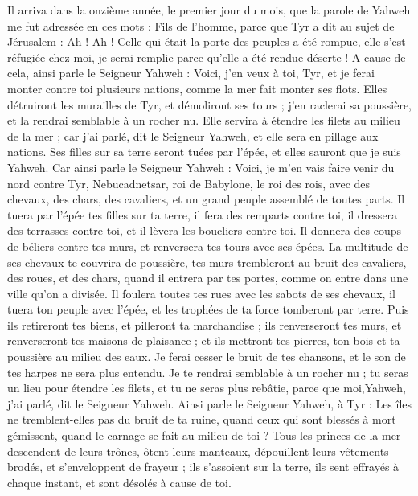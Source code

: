\begin{multicols}{2}
\VerseOne{}Il arriva dans la onzième année, le premier jour du mois, que la parole de Yahweh me fut adressée en ces mots :
Fils de l'homme, parce que Tyr a dit au sujet de Jérusalem : Ah ! Ah ! Celle qui était la porte des peuples a été rompue, elle s'est réfugiée chez moi, je serai remplie parce qu'elle a été rendue déserte !
A cause de cela, ainsi parle le Seigneur Yahweh : Voici, j'en veux à toi, Tyr, et je ferai monter contre toi plusieurs nations, comme la mer fait monter ses flots.
Elles détruiront les murailles de Tyr, et démoliront ses tours ; j'en raclerai sa poussière, et la rendrai semblable à un rocher nu.
Elle servira à étendre les filets au milieu de la mer ; car j'ai parlé, dit le Seigneur Yahweh, et elle sera en pillage aux nations.
Ses filles sur sa terre seront tuées par l'épée, et elles sauront que je suis Yahweh.
Car ainsi parle le Seigneur Yahweh : Voici, je m'en vais faire venir du nord contre Tyr, Nebucadnetsar, roi de Babylone, le roi des rois, avec des chevaux, des chars, des cavaliers, et un grand peuple assemblé de toutes parts.
Il tuera par l'épée tes filles sur ta terre, il fera des remparts contre toi, il dressera des terrasses contre toi, et il lèvera les boucliers contre toi.
Il donnera des coups de béliers contre tes murs, et renversera tes tours avec ses épées.
La multitude de ses chevaux te couvrira de poussière, tes murs trembleront au bruit des cavaliers, des roues, et des chars, quand il entrera par tes portes, comme on entre dans une ville qu'on a divisée.
Il foulera toutes tes rues avec les sabots de ses chevaux, il tuera ton peuple avec l'épée, et les trophées de ta force tomberont par terre.
Puis ils retireront tes biens, et pilleront ta marchandise ; ils renverseront tes murs, et renverseront tes maisons de plaisance ; et ils mettront tes pierres, ton bois et ta poussière au milieu des eaux.
Je ferai cesser le bruit de tes chansons, et le son de tes harpes ne sera plus entendu.
Je te rendrai semblable à un rocher nu ; tu seras un lieu pour étendre les filets, et tu ne seras plus rebâtie, parce que moi,Yahweh, j'ai parlé, dit le Seigneur Yahweh.
Ainsi parle le Seigneur Yahweh, à Tyr : Les îles ne tremblent-elles pas du bruit de ta ruine, quand ceux qui sont blessés à mort gémissent, quand le carnage se fait au milieu de toi ?
Tous les princes de la mer descendent de leurs trônes, ôtent leurs manteaux, dépouillent leurs vêtements brodés, et s'enveloppent de frayeur ; ils s'assoient sur la terre, ils sent effrayés à chaque instant, et sont désolés à cause de toi.

\end{multicols}
